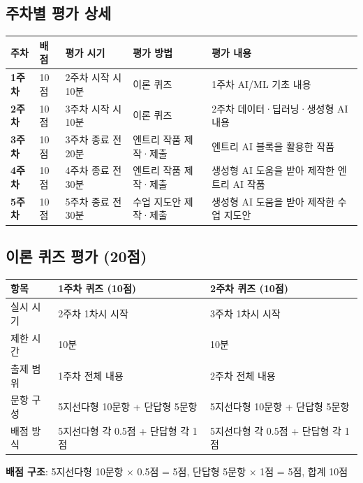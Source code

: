 \documentclass[a4paper,11pt]{article}
\begin{document}
\subsection{주차별 평가 상세}

{\small\noindent
\begin{tabularx}{\textwidth}{|>{\centering\arraybackslash}p{0.9cm}|>{\centering\arraybackslash}p{0.9cm}|p{2.8cm}|p{3.2cm}|X|}
\hline
\textbf{주차} & \textbf{배점} & \textbf{평가 시기} & \textbf{평가 방법} & \textbf{평가 내용} \\ \hline
\textbf{1주차} & 10점 & 2주차 시작 시 10분 & 이론 퀴즈 & 1주차 AI/ML 기초 내용 \\ \hline
\textbf{2주차} & 10점 & 3주차 시작 시 10분 & 이론 퀴즈 & 2주차 데이터·딥러닝·생성형 AI 내용 \\ \hline
\textbf{3주차} & 10점 & 3주차 종료 전 20분 & 엔트리 작품 제작·제출 & 엔트리 AI 블록을 활용한 작품 \\ \hline
\textbf{4주차} & 10점 & 4주차 종료 전 30분 & 엔트리 작품 제작·제출 & 생성형 AI 도움을 받아 제작한 엔트리 AI 작품 \\ \hline
\textbf{5주차} & 10점 & 5주차 종료 전 30분 & 수업 지도안 제작·제출 & 생성형 AI 도움을 받아 제작한 수업 지도안 \\ \hline
\end{tabularx}
}

\subsection{이론 퀴즈 평가 (20점)}

\noindent
\begin{tabularx}{\textwidth}{|p{2.5cm}|X|X|}
\hline
\textbf{항목} & \textbf{1주차 퀴즈 (10점)} & \textbf{2주차 퀴즈 (10점)} \\ \hline
실시 시기 & 2주차 1차시 시작 & 3주차 1차시 시작 \\ \hline
제한 시간 & 10분 & 10분 \\ \hline
출제 범위 & 1주차 전체 내용 & 2주차 전체 내용 \\ \hline
문항 구성 & 5지선다형 10문항 + 단답형 5문항 & 5지선다형 10문항 + 단답형 5문항 \\ \hline
배점 방식 & 5지선다형 각 0.5점 + 단답형 각 1점 & 5지선다형 각 0.5점 + 단답형 각 1점 \\ \hline
\end{tabularx}

\begin{quoteblock}
\textbf{배점 구조}: 5지선다형 10문항 × 0.5점 = 5점, 단답형 5문항 × 1점 = 5점, 합계 10점
\end{quoteblock}
\end{document}
